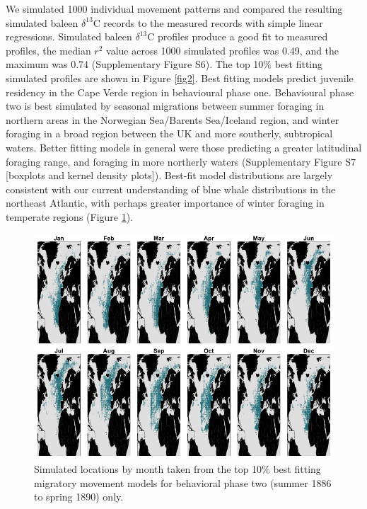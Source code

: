 \documentclass[a4paper,12pt]{article}
\begin{document}
We simulated 1000 individual movement patterns and compared the resulting simulated baleen $\delta^{13}$C records to the measured records with simple linear regressions. 
Simulated baleen $\delta^{13}$C profiles produce a good fit to measured profiles, the median $r^2$ value across 1000 simulated profiles was 0.49, and the maximum was 0.74 (Supplementary Figure S6). %
The top 10\% best fitting simulated profiles are shown in Figure \ref{fig2}. 
Best fitting models predict juvenile residency in the Cape Verde region in behavioural phase one. 
Behavioural phase two is best simulated by seasonal migrations between summer foraging in northern areas in the Norwegian Sea/Barents Sea/Iceland region, and winter foraging in a broad region between the UK and more southerly, subtropical waters. 
Better fitting models in general were those predicting a greater latitudinal foraging range, and foraging in more northerly waters (Supplementary Figure S7 [boxplots and kernel density plots]).
Best-fit model distributions are largely consistent with our current understanding of blue whale distributions in the northeast Atlantic\cite{reeves2004historical,baines2014upwellings,baines2017autumn,reeves2004historical}, with perhaps greater importance of winter foraging in temperate regions (Figure \ref{fig4}).

\begin{figure}
 \centering
  \includegraphics[width = \linewidth]{figures/Figure-4-monthly.png}
  \caption{Simulated locations by month taken from the top 10\% best fitting migratory movement models for behavioral phase two (summer 1886 to spring 1890) only.}
  \label{fig4}
\end{figure}
\end{document}
